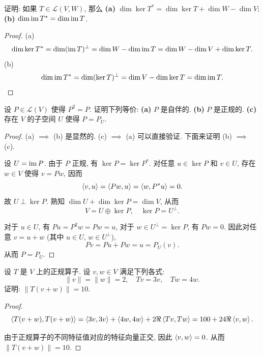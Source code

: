 \documentclass{article}
\begin{document}
\begin{problem}[7A-7]
证明: 如果 $T \in \mathcal{L}(V, W)$, 那么
\textbf{(a)} $\dim \ker T^* = \dim \ker T + \dim W - \dim V$;
\textbf{(b)} $\dim \operatorname{im} T^* = \dim \operatorname{im} T$.
\end{problem}

\begin{proof}
  (a)
  \[ \dim\ker T^*=\dim(\operatorname{im} T)^\perp = \dim W - \dim \operatorname{im} T= \dim W-\dim V +\dim \ker T. \]
  (b)
  \[ \dim\operatorname{im} T^*=\dim(\ker T)^\perp = \dim V - \dim \ker T = \dim \operatorname{im} T. \]
\end{proof}



\begin{problem}[7A-20]
设 $P \in \mathcal{L}(V)$ 使得 $P^2 = P$. 证明下列等价:
\textbf{(a)} $P$ 是自伴的.
\textbf{(b)} $P$ 是正规的.
\textbf{(c)} 存在 $V$ 的子空间 $U$ 使得 $P = P_U$.
\end{problem}

\begin{proof}
  (a) \( \implies \) (b) 是显然的. (c) \( \implies \) (a) 可以直接验证. 下面来证明 (b) \( \implies \) (c). \par
  设 \( U=\operatorname{im} P \). 由于 \( P \) 正规, 有 \( \ker P=\ker P^* \). 对任意 \( u\in\ker P \) 和 \( v\in U \), 存在 \( w\in V \) 使得 \( v=Pw \), 因而
  \[ \left\langle v, u \right\rangle=\left\langle Pw, u \right\rangle=\left\langle w, P^*u \right\rangle=0. \]
  故 \( U\perp\ker P \). 熟知 \( \dim U+\dim\ker P=\dim V \), 从而
  \[ V=U\oplus\ker P,\quad \ker P=U^\perp. \]\par
  对于 \( u\in U \), 有 \( Pu=P^2w=Pw=u \), 对于 \( w\in U^\perp=\ker P \), 有 \( Pw=0 \). 因此对任意 \( v=u+w \) (其中 \( u\in U \), \( w\in U^\perp \)),
  \[ Pv=Pu+Pw=u=P_U(v). \]
  从而 \( P=P_U \).
\end{proof}



\begin{problem}[7A-23]
设 $T$ 是 $V$ 上的正规算子. 设 $v, w \in V$ 满足下列各式:
\[\lVert v \rVert = \lVert w \rVert = 2, \quad Tv = 3v, \quad Tw = 4w.\]
证明: $\lVert T(v + w) \rVert = 10$.
\end{problem}

\begin{proof}
  \[ \left\langle T(v+w), T(v+w) \right\rangle
    =\left\langle 3v, 3v \right\rangle+\left\langle 4w, 4w \right\rangle+2\Re\left\langle Tv, Tw \right\rangle
    =100+24\Re\left\langle v, w \right\rangle. \]\par
  由于正规算子的不同特征值对应的特征向量正交, 因此 \( \left\langle v, w \right\rangle=0 \). 从而 \( \lVert T(v+w) \rVert=10 \).
\end{proof}
\end{document}
